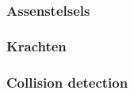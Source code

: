 \\
\subsubsection{Assenstelsels}
\label{subsec: Assenstelsels}


\subsubsection{Krachten}
\label{subsec: Krachten}


\subsubsection{Collision detection}
\label{subsec: Collision detection}

